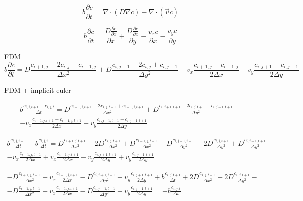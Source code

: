 \documentclass{article}
\begin{document}
$$
  b \frac{\partial c} {\partial t} =  \nabla \cdot \left(D \nabla c \right ) - \nabla \cdot (\overrightarrow{v}c) 
$$


$$
  b \frac{\partial c} {\partial t} =  \frac{D \frac{\partial  c}{\partial x}}{\partial x}  +  \frac{D \frac{\partial c}{\partial x}}{\partial y}  - \frac{v_x c}{\partial x} - \frac{v_y c}{\partial y}
$$


FDM
$$
  b \frac{\partial c} {\partial t} =  
  D \frac{c_{i+1,j} - 2c_{i,j}  +  c_{i-1,j} }{ \Delta x^2}  
  + D \frac{c_{i,j+1} - 2c_{i,j}  +  c_{i,j-1} }{ \Delta y^2} 
  - v_x\frac{ c_{i+1,j} - c_{i-1,j} }{ 2\Delta x}
  - v_y\frac{ c_{i,j+1} - c_{i,j-1} }{ 2\Delta y}
$$

FDM + implicit euler


\begin{multline}
  b \frac{c_{i,j,t+1} - c_{i,j,t}} {\Delta t} =  
  D \frac{c_{i+1,j,t+1} - 2c_{i,j,t+1}  +  c_{i-1,j,t+1} }{ \Delta x^2}  
  + D \frac{c_{i,j+1,t+1} - 2c_{i,j,t+1}  +  c_{i,j-1,t+1} }{ \Delta y^2} 
  - \\
  -  v_x\frac{ c_{i+1,j,t+1} - c_{i-1,j,t+1} }{ 2\Delta x}
  - v_y\frac{ c_{i,j+1,t+1} - c_{i,j-1,t+1} }{ 2\Delta y}
\end{multline}



\begin{multline}
  b \frac{c_{i,j,t+1}} {\Delta t} 
  - b \frac{c_{i,j,t}} {\Delta t}
  =  
  D \frac{c_{i+1,j,t+1} }{ \Delta x^2}
  - 2D \frac{ c_{i,j,t+1} }{ \Delta x^2}  
  + D \frac{ c_{i-1,j,t+1} }{ \Delta x^2}  
  + D \frac{c_{i,j+1,t+1} }{ \Delta y^2}
  - 2D \frac{c_{i,j,t+1}}{ \Delta y^2} 
  + D \frac{c_{i,j-1,t+1} }{ \Delta y^2} 
  - \\
  -  v_x\frac{ c_{i+1,j,t+1}}{ 2\Delta x}
  +  v_x\frac{ c_{i-1,j,t+1} }{ 2\Delta x}
  - v_y\frac{ c_{i,j+1,t+1} }{ 2\Delta y}
  + v_y\frac{ c_{i,j-1,t+1} }{ 2\Delta y}
\end{multline}





\begin{multline}
  - D \frac{ c_{i+1,j,t+1} }{ \Delta x^2}
  +  v_x  \frac{ c_{i+1,j,t+1} }{ 2\Delta x}
%   
  - D \frac{ c_{i,j+1,t+1} }{ \Delta y^2}
  +   v_y \frac{ c_{i,j+1,t+1} }{ 2\Delta y}
%   
  + b  \frac{ c_{i,j,t+1} }{\Delta t} 
  + 2D \frac{ c_{i,j,t+1} }{ \Delta x^2}  
  + 2D \frac{ c_{i,j,t+1} }{ \Delta y^2} 
%   
  - \\
  - D \frac{ c_{i-1,j,t+1} }{ \Delta x^2}  
  -  v_x  \frac{ c_{i-1,j,t+1} }{ 2\Delta x}
%   
  - D \frac {c_{i,j-1,t+1} }{ \Delta y^2} 
  -  v_y \frac{ c_{i,j-1,t+1} }{ 2\Delta y}
  =  
  + b \frac{c_{i,j,t}} {\Delta t}
\end{multline}
\end{document}

